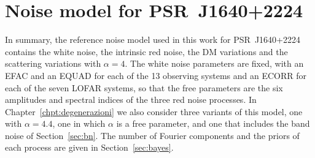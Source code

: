 \section{Noise model for PSR~J1640+2224}\label{NM}

In summary, the reference noise model used in this work for PSR~J1640+2224
contains the white noise, the intrinsic red noise, the DM variations and the
scattering variations with $\alpha = 4$. The white noise parameters are fixed,
with an EFAC and an EQUAD for each of the 13 observing systems and an ECORR for
each of the seven LOFAR systems, so that the free parameters are the six
amplitudes and spectral indices of the three red noise processes. In
Chapter~\ref{chpt:degenerazioni} we also consider three variants of this
model, one with $\alpha = 4.4$, one in which $\alpha$ is a free parameter, and
one that includes the band noise of Section~\ref{sec:bn}. The number of
Fourier components and the priors of each process are given in
Section~\ref{sec:bayes}.